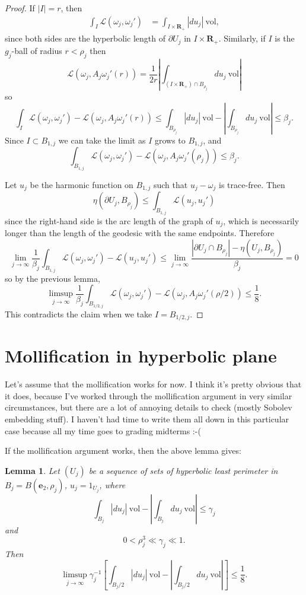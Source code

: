 \documentclass[reqno,12pt,letterpaper]{amsart}
\newcommand{\RR}{\mathbf{R}}
\newcommand{\evect}{\mathbf e}
\newcommand{\vol}{\mathrm{vol}}
\newtheorem{lemma}[theorem]{Lemma}
\theoremstyle{definition}
\numberwithin{equation}{section}
\begin{document}
\begin{proof}
If $|I| = r$, then
\begin{align*}
\int_I \mathscr L(\omega_j, \omega_j') &= \int_{I \times \RR_+} |du_j| ~\vol,
\end{align*}
since both sides are the hyperbolic length of $\partial U_j$ in $I \times \RR_+$.
Similarly, if $I$ is the $g_j$-ball of radius $r < \rho_j$ then
$$\mathscr L(\omega_j, A_j \omega_j'(r)) = \frac{1}{2r} \left|\int_{(I \times \RR_+) \cap B_{\rho_j}} du_j ~\vol\right|$$
so
$$\int_I \mathscr L(\omega_j, \omega_j') - \mathscr L(\omega_j, A_j \omega_j'(r)) \leq \int_{B_{\rho_j}} |du_j| ~\vol - \left|\int_{B_{\rho_j}} du_j ~\vol\right| \leq \beta_j.$$
Since $I \subset B_{1, j}$ we can take the limit as $I$ grows to $B_{1, j}$, and
$$\int_{B_{1, j}} \mathscr L(\omega_j, \omega_j') - \mathscr L(\omega_j, A_j \omega_j'(\rho_j)) \leq \beta_j.$$

Let $u_j$ be the harmonic function on $B_{1, j}$ such that $u_j - \omega_j$ is trace-free. Then
$$\eta(\partial U_j, B_{\rho_j}) \leq \int_{B_{1, j}} \mathscr L(u_j, u_j')$$
since the right-hand side is the arc length of the graph of $u_j$, which is necessarily longer than the length of the geodesic with the same endpoints.
Therefore
$$\lim_{j \to \infty} \frac{1}{\beta_j} \int_{B_{1, j}} \mathscr L(\omega_j, \omega_j') - \mathscr L(u_j, u_j') \leq \lim_{j \to \infty} \frac{|\partial U_j \cap B_{\rho_j}| - \eta(U_j, B_{\rho_j})}{\beta_j} = 0$$
so by the previous lemma,
$$\limsup_{j \to \infty} \frac{1}{\beta_j} \int_{B_{1/2,j}} \mathscr L(\omega_j, \omega_j') - \mathscr L(\omega_j, A_j \omega_j'(\rho/2)) \leq \frac{1}{8}.$$
This contradicts the claim when we take $I = B_{1/2,j}$.
\end{proof}

\section{Mollification in hyperbolic plane}
Let's assume that the mollification works for now.
I think it's pretty obvious that it does, because I've worked through the mollification argument in very similar circumstances, but there are a lot of annoying details to check (mostly Sobolev embedding stuff).
I haven't had time to write them all down in this particular case because all my time goes to grading midterms :-(

If the mollification argument works, then the above lemma gives:
\begin{lemma}
Let $(U_j)$ be a sequence of sets of hyperbolic least perimeter in $B_j = B(\evect_2, \rho_j)$, $u_j = 1_{U_j}$, where
$$\int_{B_j} |du_j| ~\vol - \left|\int_{B_j} du_j ~\vol\right| \leq \gamma_j$$
and
$$0 < \rho_j^3 \ll \gamma_j \ll 1.$$
Then
$$\limsup_{j \to \infty} \gamma_j^{-1}\left[\int_{B_j/2} |du_j| ~\vol - \left|\int_{B_j/2} du_j ~\vol\right|\right] \leq \frac{1}{8}.$$
\end{lemma}
\end{document}
